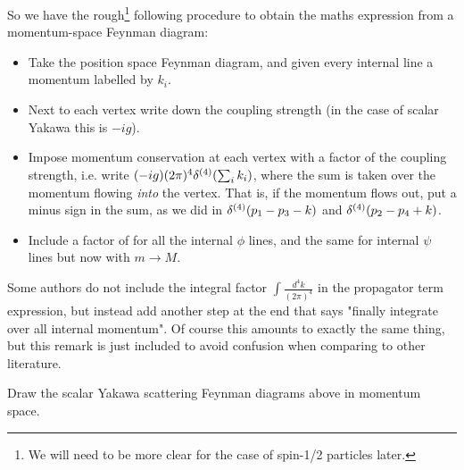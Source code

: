 So we have the rough\footnote{We will need to be more clear for the case of spin-1/2 particles later.} following procedure to obtain the maths expression from a momentum-space Feynman diagram:
\begin{itemize}
    \item Take the position space Feynman diagram, and given every internal line a momentum labelled by $k_i$.
    \item Next to each vertex write down the coupling strength (in the case of scalar Yakawa this is $-ig$).
    \item Impose momentum conservation at each vertex with a factor of the coupling strength, i.e. write $(-ig)(2\pi)^4\delta^{(4)}(\sum_i k_i)$, where the sum is taken over the momentum flowing \textit{into} the vertex. That is, if the momentum flows out, put a minus sign in the sum, as we did in $\delta^{(4)}(p_1-p_3-k)$ and $\delta^{(4)}(p_2-p_4+k)$.
    \item Include a factor of 
    \bse 
        \int {}
    \ese 
    for all the internal $\phi$ lines, and the same for internal $\psi$ lines but now with $m\to M$.
\end{itemize}

\br 
    Some authors do not include the integral factor $\int\frac{d^4k}{(2\pi)^4}$ in the propagator term expression, but instead add another step at the end that says "finally integrate over all internal momentum". Of course this amounts to exactly the same thing, but this remark is just included to avoid confusion when comparing to other literature. 
\er 

\bbox 
    Draw the scalar Yakawa scattering Feynman diagrams above in momentum space.
\ebox 